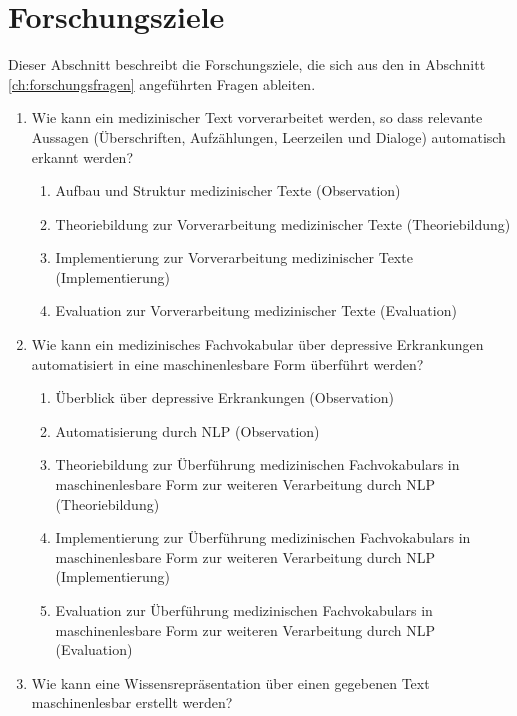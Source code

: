 
\chapter{Forschungsziele}

Dieser Abschnitt beschreibt die Forschungsziele, die sich aus den in Abschnitt \ref{ch:forschungsfragen} angeführten Fragen ableiten.



\begin{enumerate}[label=FZ \arabic*]
\item Wie kann ein medizinischer Text vorverarbeitet werden, so dass relevante Aussagen (Überschriften, Aufzählungen, Leerzeilen und Dialoge) automatisch erkannt werden?

\begin{enumerate}[label=\theenumi.\arabic*]
\item Aufbau und Struktur medizinischer Texte (Observation)
\item Theoriebildung zur Vorverarbeitung medizinischer Texte (Theoriebildung)
\item Implementierung zur Vorverarbeitung medizinischer Texte (Implementierung)
\item Evaluation zur Vorverarbeitung medizinischer Texte (Evaluation)
\end{enumerate}

\item Wie kann ein medizinisches Fachvokabular über depressive Erkrankungen automatisiert in eine maschinenlesbare Form überführt werden?

\begin{enumerate}[label=\theenumi.\arabic*]
\item Überblick über depressive Erkrankungen (Observation)
\item Automatisierung durch NLP (Observation)
\item Theoriebildung zur Überführung medizinischen Fachvokabulars in maschinenlesbare Form zur weiteren Verarbeitung durch NLP (Theoriebildung)
\item Implementierung zur Überführung medizinischen Fachvokabulars in maschinenlesbare Form zur weiteren Verarbeitung durch NLP (Implementierung)
\item Evaluation zur Überführung medizinischen Fachvokabulars in maschinenlesbare Form zur weiteren Verarbeitung durch NLP (Evaluation)

\end{enumerate}

\item Wie kann eine Wissensrepräsentation über einen gegebenen Text maschinenlesbar erstellt werden?


\end{enumerate}
